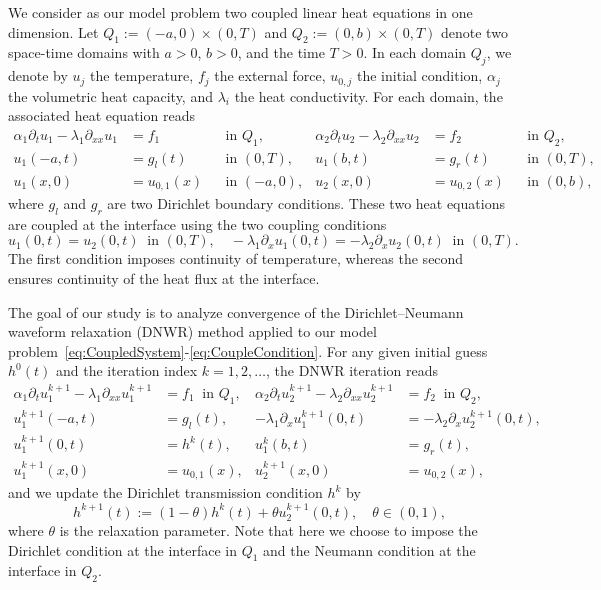\documentclass[10pt,a4paper]{amsart}
\begin{document}
We consider as our model problem two coupled linear heat equations in one dimension. Let $Q_1 := (-a, 0) \times (0, T)$ and $Q_2 := (0, b) \times (0, T)$ denote two space-time domains with $a>0$, $b>0$, and the time $T>0$. In each domain $Q_j$, we denote by $u_j$ the temperature, $f_j$ the external force, $u_{0, j}$ the initial condition, $\alpha_j$ the volumetric heat capacity, and $\lambda_i$ the heat conductivity. For each domain, the associated heat equation reads
\begin{equation}\label{eq:CoupledSystem}
	\begin{aligned}
	\alpha_1 \partial_t u_1 -\lambda_1 \partial_{xx} u_1 &= f_1& &\text{in } Q_1,&
	\alpha_2 \partial_t u_2 -\lambda_2 \partial_{xx} u_2 &= f_2&  &\text{in } Q_2,\\
	u_1(-a, t) &= g_l(t)& &\text{in } (0,T),&	
	u_1(b, t) &= g_r(t)&  &\text{in } (0,T),\\
	u_1(x, 0) &= u_{0, 1}(x)& &\text{in } (-a,0),& 
	u_2(x, 0) &= u_{0, 2}(x)& &\text{in } (0,b),
\end{aligned}
\end{equation}
where $g_l$ and $g_r$ are two Dirichlet boundary conditions. These two heat equations are coupled at the interface using the two coupling conditions
\begin{equation}\label{eq:CoupleCondition}
u_1(0, t) = u_2(0, t) \ \text{ in } (0,T), \quad 
-\lambda_1 \partial_x u_1(0, t) = -\lambda_2 \partial_x u_2(0, t) \ \text{ in } (0,T).
\end{equation}
The first condition imposes continuity of temperature, whereas the second ensures continuity of the heat flux at the interface.


The goal of our study is to analyze convergence of the Dirichlet--Neumann waveform relaxation (DNWR) method applied to our model problem~\eqref{eq:CoupledSystem}-\eqref{eq:CoupleCondition}. For any given initial guess $h^0(t)$ and the iteration index $k = 1, 2, \ldots$, the DNWR iteration reads
\begin{equation}\label{eq:DNWR}
\begin{aligned}
	\alpha_1 \partial_t u_1^{k+1} - \lambda_1 \partial_{xx} u_1^{k+1} &= f_1 \ \text{ in } Q_1,&
	\alpha_2 \partial_t u_2^{k+1} - \lambda_2 \partial_{xx} u_2^{k+1} &= f_2 \ \text{ in } Q_2, \\
	u_1^{k+1}(-a, t) &= g_l(t), \ &
	-\lambda_1 \partial_x u_1^{k+1}(0, t) &= -\lambda_2 \partial_x u_2^{k+1}(0, t), \\
	u_1^{k+1}(0, t) &= h^{k}(t), &
	u_1^k(b, t) &= g_r(t), \\
	u_1^{k+1}(x, 0) &= u_{0, 1}(x), &
	u_2^{k+1}(x, 0) &= u_{0, 2}(x),
\end{aligned}
\tag{DNWR}
\end{equation}
and we update the Dirichlet transmission condition $h^k$ by
\[h^{k+1}(t) := (1-\theta) h^k(t) + \theta u^{k+1}_2(0, t),
\quad
\theta \in (0, 1),\]
where $\theta$ is the relaxation parameter. Note that here we choose to impose the Dirichlet condition at the interface in $Q_1$ and the Neumann condition at the interface in $Q_2$. 
\end{document}
